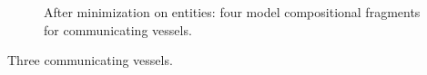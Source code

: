 \documentclass{article} %
\begin{document}
\begin{figure}[ht]
{}

\caption{After minimization on entities: four model compositional fragments for communicating vessels.}
\label{cv_frags2}
\end{figure}

Three communicating vessels.
\end{document}
